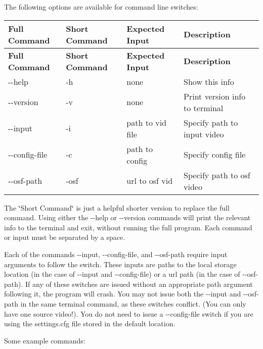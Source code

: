 The following options are available for command line switches\+:

\tabulinesep=1mm
\begin{longtabu} spread 0pt [c]{*{4}{|X[-1]}|}
\hline
\rowcolor{\tableheadbgcolor}\textbf{ Full Command }&\textbf{ Short Command }&\textbf{ Expected Input }&\textbf{ Description  }\\
\endfirsthead
\hline
\endfoot
\hline
\rowcolor{\tableheadbgcolor}\textbf{ Full Command }&\textbf{ Short Command }&\textbf{ Expected Input }&\textbf{ Description  }\\
\endhead
{\ttfamily -\/-\/help} &{\ttfamily -\/h} &none &Show this info \\
{\ttfamily -\/-\/version} &{\ttfamily -\/v} &none &Print version info to terminal \\
{\ttfamily -\/-\/input} &{\ttfamily -\/i} &path to vid file&Specify path to input video \\
{\ttfamily -\/-\/config-\/file}&{\ttfamily -\/c} &path to config &Specify config file \\
{\ttfamily -\/-\/osf-\/path} &{\ttfamily -\/osf} &url to osf vid &Specify path to osf video \\
\end{longtabu}
The \char`\"{}\+Short Command\char`\"{} is just a helpful shorter version to replace the full command. Using either the {\ttfamily -\/-\/help} or {\ttfamily -\/-\/version} commands will print the relevant info to the terminal and exit, without running the full program. Each command or input must be separated by a space.

Each of the commands {\ttfamily -\/-\/input}, {\ttfamily -\/-\/config-\/file}, and {\ttfamily -\/-\/osf-\/path} require input arguments to follow the switch. These inputs are paths to the local storage location (in the case of {\ttfamily -\/-\/input} and {\ttfamily -\/-\/config-\/file}) or a url path (in the case of {\ttfamily -\/-\/osf-\/path}). If any of these switches are issued without an appropriate path argument following it, the program will crash. You may not issue both the {\ttfamily -\/-\/input} and {\ttfamily -\/-\/osf-\/path} in the same terminal command, as these switches conflict. (You can only have one source video!). You do not need to issue a {\ttfamily -\/-\/config-\/file} switch if you are using the {\ttfamily settings.\+cfg} file stored in the default location.

Some example commands\+:


